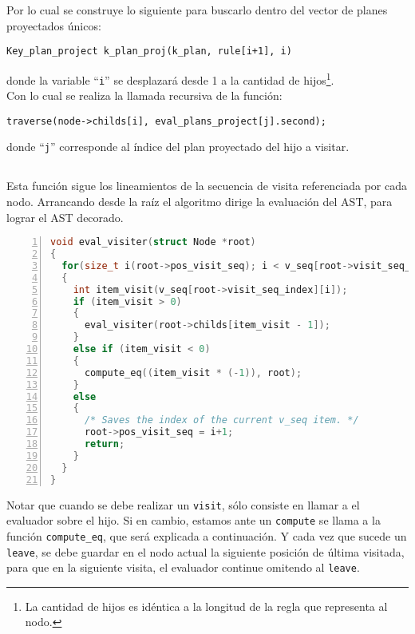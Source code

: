 Por lo cual se construye lo siguiente para buscarlo dentro del vector de planes proyectados únicos:

\begin{center}\texttt{Key\_plan\_project k\_plan\_proj(k\_plan, rule[i+1], i)}\end{center}

donde la variable ``\texttt{i}'' se desplazará desde 1 a la cantidad de hijos\footnote{La cantidad de hijos es idéntica a la longitud de la regla que representa al nodo.}.\\

Con lo cual se realiza la llamada recursiva de la función:

\begin{center}\texttt{traverse(node->childs[i], eval\_plans\_project[j].second);}\end{center}

donde ``\texttt{j}'' corresponde al índice del plan proyectado del hijo a visitar.

\subsection*{}

Esta función sigue los lineamientos de la secuencia de visita referenciada por cada nodo. Arrancando desde la raíz el algoritmo dirige la evaluación del AST, para lograr el AST decorado.

\vspace*{0.2cm}

\begin{lstlisting}[language=C++, basicstyle=\scriptsize, numbers=left, columns=fullflexible, columns=fullflexible, linewidth=13cm]
void eval_visiter(struct Node *root)
{
  for(size_t i(root->pos_visit_seq); i < v_seq[root->visit_seq_index].size(); i++)
  {
    int item_visit(v_seq[root->visit_seq_index][i]);
    if (item_visit > 0)
    {
      eval_visiter(root->childs[item_visit - 1]);
    }
    else if (item_visit < 0)
    {
      compute_eq((item_visit * (-1)), root);
    }
    else
    {
      /* Saves the index of the current v_seq item. */
      root->pos_visit_seq = i+1;
      return;
    }
  }
}
\end{lstlisting}

Notar que cuando se debe realizar un \texttt{visit}, sólo consiste en llamar a el evaluador sobre el hijo. Si en cambio, estamos ante un \texttt{compute} se llama a la función \texttt{compute\_eq}, que será explicada a continuación. Y cada vez que sucede un \texttt{leave}, se debe guardar en el nodo actual la siguiente posición de última visitada, para que en la siguiente visita, el evaluador continue omitendo al \texttt{leave}.

\normalsize
